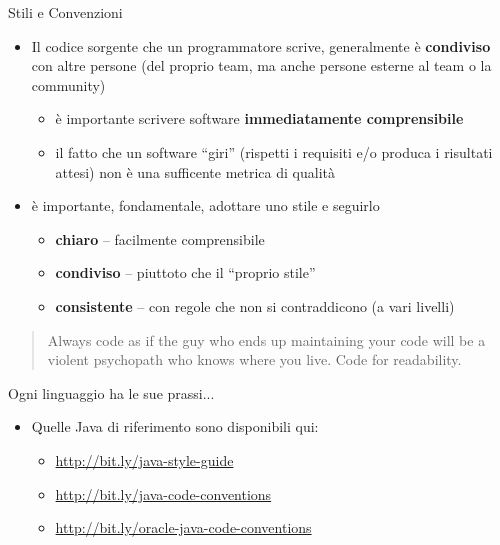 \documentclass[xcolor=dvipsnames,presentation]{beamer}
\begin{document}
\begin{frame}[allowframebreaks]{Stili e Convenzioni}
    \begin{itemize}\itemsep10pt
        \item Il codice sorgente che un programmatore scrive, generalmente è \textbf{condiviso} con altre persone (del proprio team, ma anche persone esterne al team o la community)
        \begin{itemize}
            \item è importante scrivere software \textbf{immediatamente comprensibile}
            \item il fatto che un software ``giri'' (rispetti i requisiti e/o produca i risultati attesi) non è una sufficente metrica di qualità
        \end{itemize}
        \item è importante, fondamentale, adottare uno stile e seguirlo
        \begin{itemize}
            \item \textbf{chiaro} -- facilmente comprensibile
            \item \textbf{condiviso} -- piuttoto che il ``proprio stile''
            \item \textbf{consistente} --  con regole che non si contraddicono (a vari livelli)
        \end{itemize}
    \end{itemize}

\begin{block}{}
\begin{quote}
Always code as if the guy who ends up maintaining your code will be a violent psychopath who knows where you live. Code for readability.
\end{quote}
\end{block}

\begin{block}{Ogni linguaggio ha le sue prassi...}
\begin{itemize}
        \item Quelle Java di riferimento sono disponibili qui:
        \tiny
        \begin{itemize}
            \item \url{http://bit.ly/java-style-guide}
            \item \url{http://bit.ly/java-code-conventions}
            \item \url{http://bit.ly/oracle-java-code-conventions}
        \end{itemize}
    \end{itemize}
\end{block}


\end{frame}
\end{document}
